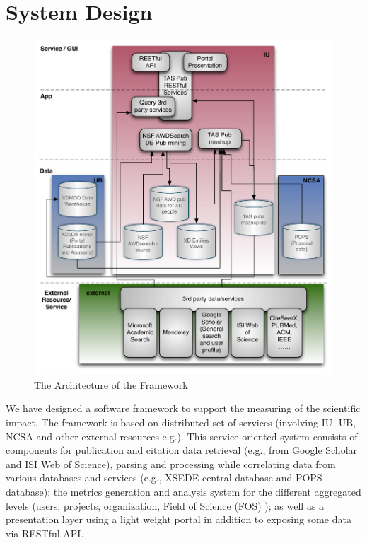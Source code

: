 \documentclass{sig-alternate}
\begin{document}
% 
 
\section{System Design} \label{S:design}
 
\begin{figure}[htb] 
  \centering 
    \includegraphics[width=1.0\columnwidth]{images/tas-arch.pdf} 
  \caption{The Architecture of the Framework}\label{F:tas-arch} 
\end{figure} 
  
We have designed a software framework to support the measuring of the scientific impact. The framework is based on distributed set of services (involving IU, UB, NCSA and other external resources e.g.). This service-oriented system  consists of components for  publication and citation data retrieval (e.g., from Google Scholar and ISI Web of Science), parsing and processing while correlating data from various databases and services (e.g., XSEDE central database and POPS database); the metrics generation and analysis system for the different aggregated levels (users, projects, organization, Field of Science (FOS) ); as well as a presentation layer using a light weight portal in addition to exposing some data via RESTful API. 
 
\end{document}
